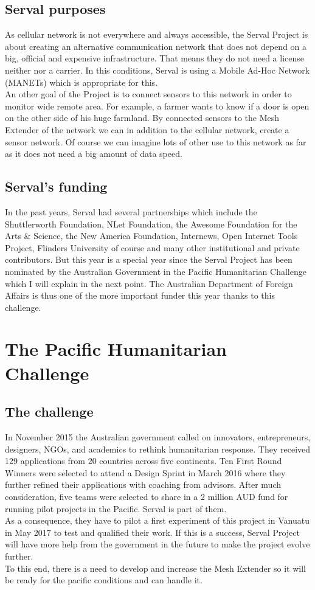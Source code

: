 \subsection{Serval purposes}
As cellular network is not everywhere and always accessible, the Serval Project is about creating an alternative communication network that does not depend on a big, official and expensive infrastructure. That means they do not need a license neither nor a carrier. In this conditions, Serval is using a Mobile Ad-Hoc Network (MANETs) which is appropriate for this. \\
An other goal of the Project is to connect sensors to this network in order to monitor wide remote area. For example, a farmer wants to know if a door is open on the other side of his huge farmland. By connected sensors to the Mesh Extender of the network we can in addition to the cellular network, create a sensor network. Of course we can imagine lots of other use to this network as far as it does not need a big amount of data speed. 


\subsection{Serval's funding}
In the past years, Serval had several partnerships which include the Shuttlerworth Foundation, NLet Foundation, the Awesome Foundation for the Arts & Science, the New America Foundation, Internews, Open Internet Tools Project, Flinders University of course and many other institutional and private contributors. But this year is a special year since the Serval Project has been nominated by the Australian Government in the Pacific Humanitarian Challenge which I will explain in the next point. The Australian Department of Foreign Affairs is thus one of the more important funder this year thanks to this challenge. 


\section{The Pacific Humanitarian Challenge}
\subsection{The challenge}
In November 2015 the Australian government called on innovators, entrepreneurs, designers, NGOs, and academics to rethink humanitarian response. They received 129 applications from 20 countries across five continents. Ten First Round Winners were selected to attend a Design Sprint in March 2016 where they further refined their applications with coaching from advisors. After much consideration, five teams were selected to share in a 2 million AUD fund for running pilot projects in the Pacific. Serval is part of them. \\
As a consequence, they have to pilot a first experiment of this project in Vanuatu in May 2017 to test and qualified their work. If this is a success, Serval Project will have more help from the government in the future to make the project evolve further. \\
To this end, there is a need to develop and increase the Mesh Extender so it will be ready for the pacific conditions and can handle it.

